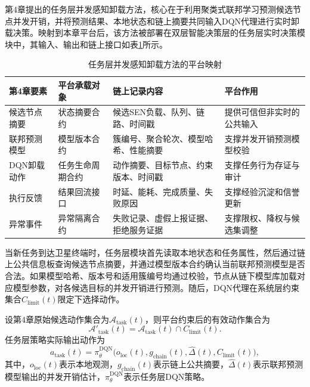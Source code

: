 第4章提出的任务层并发感知卸载方法，核心在于利用聚类式联邦学习预测候选节点并发开销，并将预测结果、本地状态和链上摘要共同输入DQN代理进行实时卸载决策。映射到本章平台后，该方法被部署在双层智能决策层的任务层实时决策模块中，其输入、输出和链上接口如表\ref{tab:ch4_mapping}所示。

\begin{table}[htbp]
  \centering
  \caption{任务层并发感知卸载方法的平台映射}
  \label{tab:ch4_mapping}
  \begin{tabular}{p{2.8cm}p{4.2cm}p{4.0cm}p{3.0cm}}
    \toprule
    第4章要素 & 平台承载对象 & 链上记录内容 & 平台作用 \\
    \midrule
    候选节点摘要 & 状态摘要合约 & 候选SEN负载、队列、链路、时间戳 & 提供可信但非实时的公共输入 \\
    联邦预测模型 & 模型版本合约 & 簇编号、聚合轮次、模型哈希、性能摘要 & 支撑并发开销预测模型校验 \\
    DQN卸载动作 & 任务生命周期合约 & 动作摘要、目标节点、约束版本、时间戳 & 支撑任务行为存证与审计 \\
    执行反馈 & 结果回流接口 & 时延、能耗、完成质量、失败原因 & 支撑经验沉淀和信誉更新 \\
    异常事件 & 异常隔离合约 & 失败记录、虚假上报证据、拒绝服务证据 & 支撑限权、降权与候选集调整 \\
    \bottomrule
  \end{tabular}
\end{table}

当新任务到达卫星终端时，任务层模块首先读取本地状态和任务属性，然后通过链上公共信息板查询候选节点摘要，并通过模型版本合约确认当前联邦预测模型是否合法。如果模型哈希、版本号和适用簇编号均通过校验，节点从链下模型库加载对应模型参数，对各候选目标的并发开销进行预测。随后，DQN代理在系统层约束集合\(C_{\mathrm{limit}}(t)\)限定下选择动作。

设第4章原始候选动作集合为\(\mathcal{A}_{\mathrm{task}}(t)\)，则平台约束后的有效动作集合为
\begin{equation}
  \mathcal{A}'_{\mathrm{task}}(t)=\mathcal{A}_{\mathrm{task}}(t)\cap C_{\mathrm{limit}}(t).
  \label{eq:constrained_action_space}
\end{equation}
任务层策略实际输出动作为
\begin{equation}
  a_{\mathrm{task}}(t)=\pi_{\theta}^{\mathrm{DQN}}\big(o_{\mathrm{loc}}(t),g_{\mathrm{chain}}(t),\widehat{\Delta}(t),C_{\mathrm{limit}}(t)\big),
  \label{eq:task_policy_platform}
\end{equation}
其中，\(o_{\mathrm{loc}}(t)\)表示本地观测，\(g_{\mathrm{chain}}(t)\)表示链上公共摘要，\(\widehat{\Delta}(t)\)表示联邦预测模型输出的并发开销估计，\(\pi_{\theta}^{\mathrm{DQN}}\)表示任务层DQN策略。

